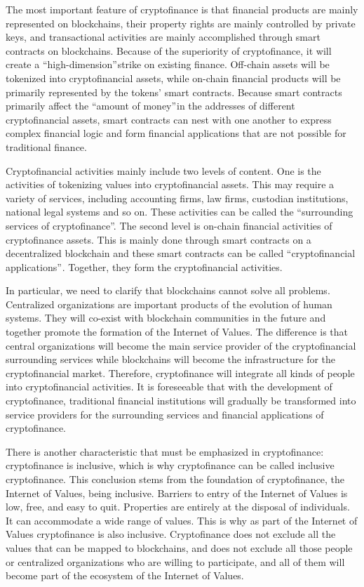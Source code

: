 \documentclass[a4paper,12pt]{article}
\begin{document}
The most important feature of cryptofinance is that financial products are mainly represented on blockchains, their property rights are mainly controlled by private keys, and transactional activities are mainly accomplished through smart contracts on blockchains. Because of the superiority of cryptofinance, it will create a “high-dimension” strike on existing finance. Off-chain assets will be tokenized into cryptofinancial assets, while on-chain financial products will be primarily represented by the tokens' smart contracts. Because smart contracts primarily affect the “amount of money” in the addresses of different cryptofinancial assets, smart contracts can nest with one another to express complex financial logic and form financial applications that are not possible for traditional finance.

Cryptofinancial activities mainly include two levels of content. One is the activities of tokenizing values into cryptofinancial assets. This may require a variety of services, including accounting firms, law firms, custodian institutions, national legal systems and so on. These activities can be called the “surrounding services of cryptofinance”. The second level is on-chain financial activities of cryptofinance assets. This is mainly done through smart contracts on a decentralized blockchain and these smart contracts can be called “cryptofinancial applications” . Together, they form the cryptofinancial activities.

In particular, we need to clarify that blockchains cannot solve all problems. Centralized organizations are important products of the evolution of human systems. They will co-exist with blockchain communities in the future and together promote the formation of the Internet of Values. The difference is that central organizations will become the main service provider of the cryptofinancial surrounding services while blockchains will become the infrastructure for the cryptofinancial market. Therefore, cryptofinance will integrate all kinds of people into cryptofinancial activities. It is foreseeable that with the development of cryptofinance, traditional financial institutions will gradually be transformed into service providers for the surrounding services and financial applications of cryptofinance.

There is another characteristic that must be emphasized in cryptofinance: cryptofinance is inclusive, which is why cryptofinance can be called inclusive cryptofinance. This conclusion stems from the foundation of cryptofinance, the Internet of Values, being inclusive. Barriers to entry of the Internet of Values is low, free, and easy to quit. Properties are entirely at the disposal of individuals. It can accommodate a wide range of values. This is why as part of the Internet of Values cryptofinance is also inclusive. Cryptofinance does not exclude all the values that can be mapped to blockchains, and does not exclude all those people or centralized organizations who are willing to participate, and all of them will become part of the ecosystem of the Internet of Values.
\end{document}
